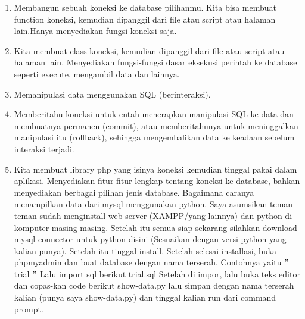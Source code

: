 	\begin{enumerate}
		\item Membangun sebuah koneksi ke database pilihanmu. Kita bisa membuat function koneksi, kemudian dipanggil dari file atau script atau halaman lain.Hanya menyediakan fungsi koneksi saja. 
		\noindent
		
		\item Kita membuat class koneksi, kemudian dipanggil dari file atau script atau halaman lain.
Menyediakan fungsi-fungsi dasar eksekusi perintah ke database seperti execute, mengambil data dan lainnya.
		\noindent
		
		\item Memanipulasi data menggunakan SQL (berinteraksi). 
		\noindent
		
		\item Memberitahu koneksi untuk entah menerapkan manipulasi SQL ke data dan membuatnya permanen (commit), atau memberitahunya untuk meninggalkan manipulasi itu (rollback), sehingga mengembalikan data ke keadaan sebelum interaksi terjadi. 
		\noindent 
		
		\item Kita membuat library php yang isinya koneksi kemudian tinggal pakai dalam aplikasi.
Menyediakan fitur-fitur lengkap tentang koneksi ke database, bahkan menyediakan berbagai pilihan jenis database.
Bagaimana caranya menampilkan data dari mysql menggunakan python. Saya asumsikan teman-teman sudah menginstall web server (XAMPP/yang lainnya) dan python di komputer masing-masing. Setelah itu semua siap sekarang silahkan download mysql connector untuk python disini (Sesuaikan dengan versi python yang kalian punya). Setelah itu tinggal install. 
Setelah selesai installasi, buka phpmyadmin dan buat database dengan nama terserah. Contohnya yaitu  $ " $trial $ " $ Lalu import sql berikut 
\noindent 
trial.sql 
\noindent 
Setelah di impor, lalu buka teks editor dan copas-kan code berikut 
\noindent 
show-data.py
\noindent 
lalu simpan dengan nama terserah kalian (punya saya show-data.py) dan tinggal kalian run dari command prompt.
\vspace{12pt}
\noindent 


\end{enumerate}
